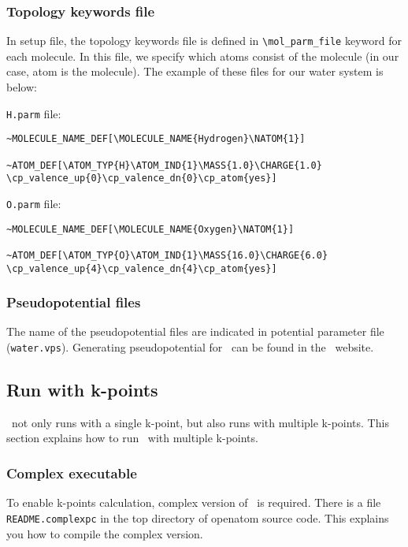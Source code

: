 \subsubsection{Topology keywords file}

In setup file, the topology keywords file is defined in \verb+\mol_parm_file+ keyword for each molecule. In this file, we specify which atoms consist of the molecule (in our case, atom is the molecule). The example of these files for our water system is below:

\verb+H.parm+ file:

\begin{verbatim}
~MOLECULE_NAME_DEF[\MOLECULE_NAME{Hydrogen}\NATOM{1}]

~ATOM_DEF[\ATOM_TYP{H}\ATOM_IND{1}\MASS{1.0}\CHARGE{1.0}
\cp_valence_up{0}\cp_valence_dn{0}\cp_atom{yes}]
\end{verbatim}

\verb+O.parm+ file:

\begin{verbatim}
~MOLECULE_NAME_DEF[\MOLECULE_NAME{Oxygen}\NATOM{1}]

~ATOM_DEF[\ATOM_TYP{O}\ATOM_IND{1}\MASS{16.0}\CHARGE{6.0}
\cp_valence_up{4}\cp_valence_dn{4}\cp_atom{yes}]
\end{verbatim}

\subsubsection{Pseudopotential files}
The name of the pseudopotential files are indicated in potential parameter file (\verb+water.vps+). Generating pseudopotential for \openatom \ can be found in the \openatom \ website.



\subsection{Run with k-points}
\openatom\ not only runs with a single k-point, but also runs with multiple k-points. This section explains how to run \openatom\ with multiple k-points. 

\subsubsection{Complex executable}
To enable k-points calculation, complex version of \openatom\ is required. 
There is a file \verb+README.complexpc+ in the top directory of openatom source code. This explains you how to compile the complex version.

